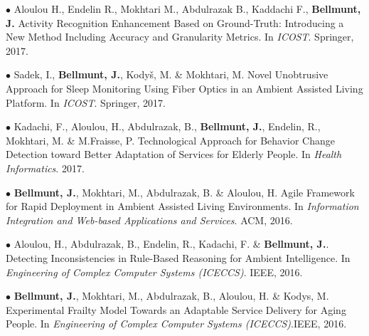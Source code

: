 \documentclass[paper=a4,fontsize=11pt]{temp} %
\begin{document}
\begin{minipage}{0.88\linewidth}
\begin{footnotesize}
 
$\bullet$ Aloulou H., Endelin R., Mokhtari M., Abdulrazak B., Kaddachi F., \textbf{\textcolor{blueCV}{Bellmunt, J.}} Activity Recognition Enhancement Based on Ground-Truth: Introducing a New Method Including Accuracy and Granularity Metrics. In \textit{ICOST}. Springer, 2017.

  

$\bullet$ Sadek, I., \textbf{\textcolor{blueCV}{Bellmunt, J.}}, Kodyš, M. \& Mokhtari, M. Novel Unobtrusive Approach for Sleep Monitoring Using Fiber Optics in an Ambient Assisted Living Platform. In \textit{ICOST}. Springer, 2017.

$\bullet$ Kadachi, F., Aloulou, H., Abdulrazak, B., \textbf{\textcolor{blueCV}{Bellmunt, J.}}, Endelin, R., Mokhtari, M. \& M.Fraisse, P. Technological Approach for Behavior Change Detection toward Better Adaptation of Services for Elderly People. In \textit{Health Informatics}. 2017.
 

$\bullet$ \textbf{\textcolor{blueCV}{Bellmunt, J.}}, Mokhtari, M., Abdulrazak, B. \& Aloulou, H.  Agile Framework for Rapid Deployment in Ambient Assisted Living Environments. In \textit{Information Integration and Web-based Applications and Services}. ACM, 2016.


$\bullet$ Aloulou, H., Abdulrazak, B., Endelin, R., Kadachi, F. \& \textbf{\textcolor{blueCV}{Bellmunt, J.}}. Detecting Inconsistencies in Rule-Based Reasoning for Ambient Intelligence. In \textit{Engineering of Complex Computer Systems (ICECCS)}. IEEE, 2016.


$\bullet$ \textbf{\textcolor{blueCV}{Bellmunt, J.}}, Mokhtari, M., Abdulrazak, B., Aloulou, H. \& Kodys, M. Experimental Frailty Model Towards an Adaptable Service Delivery for Aging People. In \textit{Engineering of Complex Computer Systems (ICECCS)}.IEEE, 2016.


\end{footnotesize}
\end{minipage}
\end{document}
